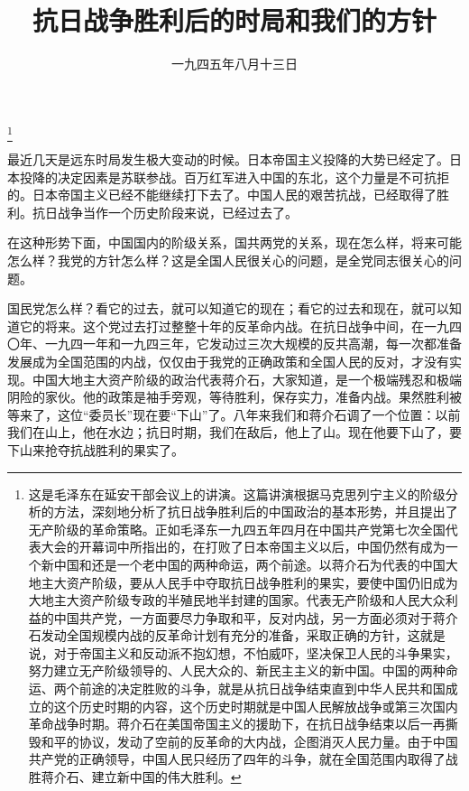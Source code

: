 
\title{抗日战争胜利后的时局和我们的方针}
\date{一九四五年八月十三日}
\thanks{这是毛泽东在延安干部会议上的讲演。这篇讲演根据马克思列宁主义的阶级分析的方法，深刻地分析了抗日战争胜利后的中国政治的基本形势，并且提出了无产阶级的革命策略。正如毛泽东一九四五年四月在中国共产党第七次全国代表大会的开幕词中所指出的，在打败了日本帝国主义以后，中国仍然有成为一个新中国和还是一个老中国的两种命运，两个前途。以蒋介石为代表的中国大地主大资产阶级，要从人民手中夺取抗日战争胜利的果实，要使中国仍旧成为大地主大资产阶级专政的半殖民地半封建的国家。代表无产阶级和人民大众利益的中国共产党，一方面要尽力争取和平，反对内战，另一方面必须对于蒋介石发动全国规模内战的反革命计划有充分的准备，采取正确的方针，这就是说，对于帝国主义和反动派不抱幻想，不怕威吓，坚决保卫人民的斗争果实，努力建立无产阶级领导的、人民大众的、新民主主义的新中国。中国的两种命运、两个前途的决定胜败的斗争，就是从抗日战争结束直到中华人民共和国成立的这个历史时期的内容，这个历史时期就是中国人民解放战争或第三次国内革命战争时期。蒋介石在美国帝国主义的援助下，在抗日战争结束以后一再撕毁和平的协议，发动了空前的反革命的大内战，企图消灭人民力量。由于中国共产党的正确领导，中国人民只经历了四年的斗争，就在全国范围内取得了战胜蒋介石、建立新中国的伟大胜利。}
\maketitle


最近几天是远东时局发生极大变动的时候。日本帝国主义投降的大势已经定了。日本投降的决定因素是苏联参战。百万红军进入中国的东北，这个力量是不可抗拒的。日本帝国主义已经不能继续打下去了。中国人民的艰苦抗战，已经取得了胜利。抗日战争当作一个历史阶段来说，已经过去了。

在这种形势下面，中国国内的阶级关系，国共两党的关系，现在怎么样，将来可能怎么样？我党的方针怎么样？这是全国人民很关心的问题，是全党同志很关心的问题。

国民党怎么样？看它的过去，就可以知道它的现在；看它的过去和现在，就可以知道它的将来。这个党过去打过整整十年的反革命内战。在抗日战争中间，在一九四〇年、一九四一年和一九四三年，它发动过三次大规模的反共高潮，每一次都准备发展成为全国范围的内战，仅仅由于我党的正确政策和全国人民的反对，才没有实现。中国大地主大资产阶级的政治代表蒋介石，大家知道，是一个极端残忍和极端阴险的家伙。他的政策是袖手旁观，等待胜利，保存实力，准备内战。果然胜利被等来了，这位“委员长”现在要“下山”了。八年来我们和蒋介石调了一个位置：以前我们在山上，他在水边；抗日时期，我们在敌后，他上了山。现在他要下山了，要下山来抢夺抗战胜利的果实了。

